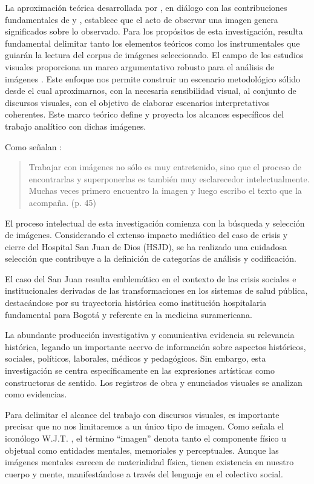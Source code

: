 La aproximación teórica desarrollada por \parencite{DidiHuberman2011}, en diálogo con las contribuciones fundamentales de \parencite{Benjamin2004} y \parencite{Warburg2010}, establece que el acto de observar una imagen genera significados sobre lo observado. Para los propósitos de esta investigación, resulta fundamental delimitar tanto los elementos teóricos como los instrumentales que guiarán la lectura del corpus de imágenes seleccionado. El campo de los estudios visuales proporciona un marco argumentativo robusto para el análisis de imágenes \parencite{Abril2007}. Este enfoque nos permite construir un escenario metodológico sólido desde el cual aproximarnos, con la necesaria sensibilidad visual, al conjunto de discursos visuales, con el objetivo de elaborar escenarios interpretativos coherentes. Este marco teórico define y proyecta los alcances específicos del trabajo analítico con dichas imágenes.


Como señalan \parencite{Perez2010}:
\begin{quote}
Trabajar con imágenes no sólo es muy entretenido, sino que el proceso de encontrarlas y superponerlas es también muy esclarecedor intelectualmente. Muchas veces primero encuentro la imagen y luego escribo el texto que la acompaña. (p. 45)
\end{quote}

El proceso intelectual de esta investigación comienza con la búsqueda y selección de imágenes. Considerando el extenso impacto mediático del caso de crisis y cierre del Hospital San Juan de Dios (HSJD), se ha realizado una cuidadosa selección que contribuye a la definición de categorías de análisis y codificación.

El caso del San Juan resulta emblemático en el contexto de las crisis sociales e institucionales derivadas de las transformaciones en los sistemas de salud pública, destacándose por su trayectoria histórica como institución hospitalaria fundamental para Bogotá y referente en la medicina suramericana.

La abundante producción investigativa y comunicativa evidencia su relevancia histórica, legando un importante acervo de información sobre aspectos históricos, sociales, políticos, laborales, médicos y pedagógicos. Sin embargo, esta investigación se centra específicamente en las expresiones artísticas como constructoras de sentido. Los registros de obra y enunciados visuales se analizan como evidencias. 

Para delimitar el alcance del trabajo con discursos visuales, es importante precisar que no nos limitaremos a un único tipo de imagen. Como señala el iconólogo W.J.T. \parencite{Mitchell2005}, el término ``imagen'' denota tanto el componente físico u objetual como entidades mentales, memoriales y perceptuales. Aunque las imágenes mentales carecen de materialidad física, tienen existencia en nuestro cuerpo y mente, manifestándose a través del lenguaje en el colectivo social.

